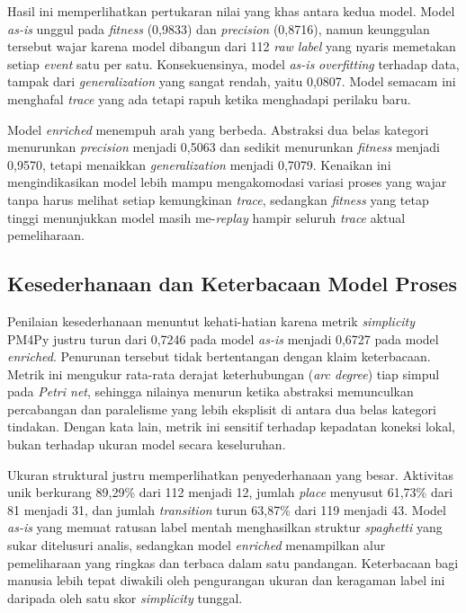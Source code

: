 
Hasil ini memperlihatkan pertukaran nilai yang khas antara kedua model. Model \textit{as-is} unggul pada \textit{fitness} (0,9833) dan \textit{precision} (0,8716), namun keunggulan tersebut wajar karena model dibangun dari 112 \textit{raw label} yang nyaris memetakan setiap \textit{event} satu per satu. Konsekuensinya, model \textit{as-is} \textit{overfitting} terhadap data, tampak dari \textit{generalization} yang sangat rendah, yaitu 0,0807. Model semacam ini menghafal \textit{trace} yang ada tetapi rapuh ketika menghadapi perilaku baru.

Model \textit{enriched} menempuh arah yang berbeda. Abstraksi dua belas kategori menurunkan \textit{precision} menjadi 0,5063 dan sedikit menurunkan \textit{fitness} menjadi 0,9570, tetapi menaikkan \textit{generalization} menjadi 0,7079. Kenaikan ini mengindikasikan model lebih mampu mengakomodasi variasi proses yang wajar tanpa harus melihat setiap kemungkinan \textit{trace}, sedangkan \textit{fitness} yang tetap tinggi menunjukkan model masih me-\textit{replay} hampir seluruh \textit{trace} aktual pemeliharaan.

\subsection{Kesederhanaan dan Keterbacaan Model Proses}

Penilaian kesederhanaan menuntut kehati-hatian karena metrik \textit{simplicity} PM4Py justru turun dari 0,7246 pada model \textit{as-is} menjadi 0,6727 pada model \textit{enriched}. Penurunan tersebut tidak bertentangan dengan klaim keterbacaan. Metrik ini mengukur rata-rata derajat keterhubungan (\textit{arc degree}) tiap simpul pada \textit{Petri net}, sehingga nilainya menurun ketika abstraksi memunculkan percabangan dan paralelisme yang lebih eksplisit di antara dua belas kategori tindakan. Dengan kata lain, metrik ini sensitif terhadap kepadatan koneksi lokal, bukan terhadap ukuran model secara keseluruhan.

Ukuran struktural justru memperlihatkan penyederhanaan yang besar. Aktivitas unik berkurang 89,29\% dari 112 menjadi 12, jumlah \textit{place} menyusut 61,73\% dari 81 menjadi 31, dan jumlah \textit{transition} turun 63,87\% dari 119 menjadi 43. Model \textit{as-is} yang memuat ratusan label mentah menghasilkan struktur \textit{spaghetti} yang sukar ditelusuri analis, sedangkan model \textit{enriched} menampilkan alur pemeliharaan yang ringkas dan terbaca dalam satu pandangan. Keterbacaan bagi manusia lebih tepat diwakili oleh pengurangan ukuran dan keragaman label ini daripada oleh satu skor \textit{simplicity} tunggal.

